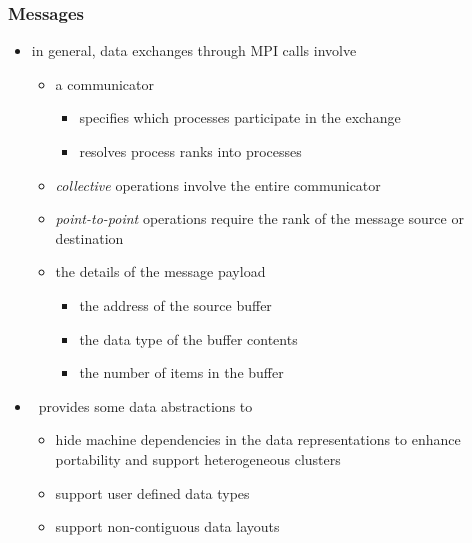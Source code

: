 \begin{frame}[fragile]
%
  \frametitle{Messages}
%
  \begin{itemize}
%
  \item in general, data exchanges through MPI calls involve
    \begin{itemize}
    \item a communicator
      \begin{itemize}
      \item specifies which processes participate in the exchange
      \item resolves process ranks into processes
      \end{itemize}        
    \item {\em collective} operations involve the entire communicator
    \item {\em point-to-point} operations require the rank of the message source or destination
    \item the details of the message payload
      \begin{itemize}
      \item the address of the source buffer
      \item the data type of the buffer contents
      \item the number of items in the buffer
      \end{itemize}
    \end{itemize}
%
    \item \mpi\ provides some data abstractions to
      \begin{itemize}
      \item hide machine dependencies in the data representations to enhance portability and
        support heterogeneous clusters
      \item support user defined data types
      \item support non-contiguous data layouts
      \end{itemize}        
      
%
  \end{itemize}
%
\end{frame}

